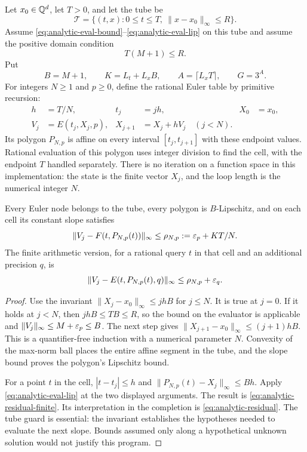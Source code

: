 Let $x_0\in\mathbb Q^d$, let $T>0$, and let the tube be
\[
 \mathcal T=\{(t,x):0\le t\le T,\ \|x-x_0\|_\infty\le R\}.
\]
Assume \eqref{eq:analytic-eval-bound}--\eqref{eq:analytic-eval-lip} on this tube and assume the positive domain condition
\begin{equation}
 T(M+1)\le R.\label{eq:analytic-tube}
\end{equation}
Put
\[
 B=M+1,\qquad K=L_t+L_xB,\qquad
 A=\lceil L_xT\rceil,\qquad G=3^A.
\]
For integers $N\ge1$ and $p\ge0$, define the rational Euler table by primitive recursion:
\begin{align*}
 h&=T/N,& t_j&=jh,& X_0&=x_0,\\
 V_j&=E(t_j,X_j,p),& X_{j+1}&=X_j+hV_j\quad(j<N).
\end{align*}
Its polygon $P_{N,p}$ is affine on every interval $[t_j,t_{j+1}]$ with these endpoint values.  Rational evaluation of this polygon uses integer division to find the cell, with the endpoint $T$ handled separately.  There is no iteration on a function space in this implementation: the state is the finite vector $X_j$, and the loop length is the numerical integer $N$.

\begin{lemma}
\label{lem:analytic-euler-defect}
Every Euler node belongs to the tube, every polygon is $B$-Lipschitz, and on each cell its constant slope satisfies
\begin{equation}
 \|V_j-F(t,P_{N,p}(t))\|_\infty
 \le \rho_{N,p}:=\varepsilon_p+KT/N.\label{eq:analytic-residual}
\end{equation}
The finite arithmetic version, for a rational query $t$ in that cell and an additional precision $q$, is
\begin{equation}
 \|V_j-E(t,P_{N,p}(t),q)\|_\infty
 \le\rho_{N,p}+\varepsilon_q.\label{eq:analytic-residual-finite}
\end{equation}
\end{lemma}

\begin{proof}
Use the invariant $\|X_j-x_0\|_\infty\le jhB$ for $j\le N$.  It is true at $j=0$.  If it holds at $j<N$, then $jhB\le TB\le R$, so the bound on the evaluator is applicable and $\|V_j\|_\infty\le M+\varepsilon_p\le B$.  The next step gives $\|X_{j+1}-x_0\|_\infty\le(j+1)hB$.  This is a quantifier-free induction with a numerical parameter $N$.  Convexity of the max-norm ball places the entire affine segment in the tube, and the slope bound proves the polygon's Lipschitz bound.

For a point $t$ in the cell, $|t-t_j|\le h$ and $\|P_{N,p}(t)-X_j\|_\infty\le Bh$.  Apply \eqref{eq:analytic-eval-lip} at the two displayed arguments.  The result is \eqref{eq:analytic-residual-finite}.  Its interpretation in the completion is \eqref{eq:analytic-residual}.  The tube guard is essential: the invariant establishes the hypotheses needed to evaluate the next slope.  Bounds assumed only along a hypothetical unknown solution would not justify this program.
\end{proof}

